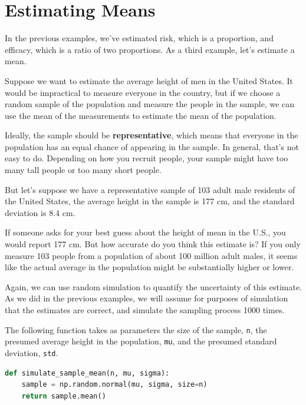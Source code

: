 \hypertarget{estimating-means}{%
\section{Estimating Means}\label{estimating-means}}

In the previous examples, we've estimated risk, which is a proportion,
and efficacy, which is a ratio of two proportions. As a third example,
let's estimate a mean.

Suppose we want to estimate the average height of men in the United
States. It would be impractical to measure everyone in the country, but
if we choose a random sample of the population and measure the people in
the sample, we can use the mean of the measurements to estimate the mean
of the population.

Ideally, the sample should be \textbf{representative}, which means that
everyone in the population has an equal chance of appearing in the
sample. In general, that's not easy to do. Depending on how you recruit
people, your sample might have too many tall people or too many short
people.

But let's suppose we have a representative sample of 103 adult male
residents of the United States, the average height in the sample is 177
cm, and the standard deviation is 8.4 cm.

If someone asks for your best guess about the height of mean in the
U.S., you would report 177 cm. But how accurate do you think this
estimate is? If you only measure 103 people from a population of about
100 million adult males, it seems like the actual average in the
population might be substantially higher or lower.

Again, we can use random simulation to quantify the uncertainty of this
estimate. As we did in the previous examples, we will assume for
purposes of simulation that the estimates are correct, and simulate the
sampling process 1000 times.

The following function takes as parameters the size of the sample,
\passthrough{\lstinline!n!}, the presumed average height in the
population, \passthrough{\lstinline!mu!}, and the presumed standard
deviation, \passthrough{\lstinline!std!}.

\begin{lstlisting}[language=Python,style=source]
def simulate_sample_mean(n, mu, sigma):
    sample = np.random.normal(mu, sigma, size=n)
    return sample.mean()
\end{lstlisting}

